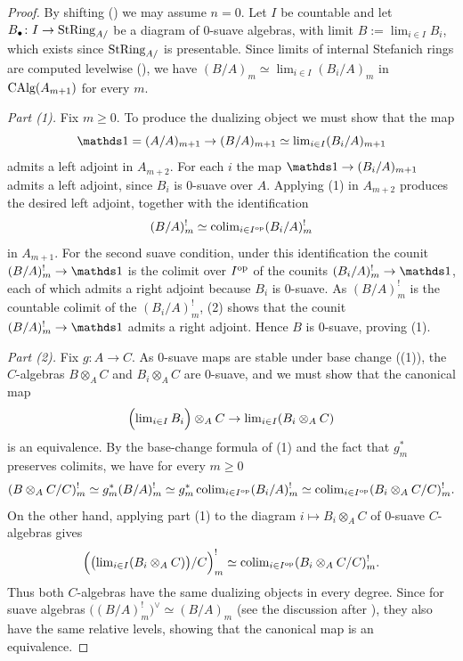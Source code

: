 \documentclass[11pt]{book}
\begin{document}
	\begin{proof}
		By shifting () we may assume $n = 0$. Let $I$ be countable and let $B_\bullet\colon I \to \StRing_{A/}$ be a diagram of $0$-suave algebras, with limit $B := \lim_{i \in I} B_i$, which exists since $\StRing_{A/}$ is presentable. Since limits of internal Stefanich rings are computed levelwise (), we have $(B/A)_m \simeq \lim_{i \in I} (B_i/A)_m$ in $\CAlg(A_{m+1})$ for every $m$.

		\emph{Part (1).} Fix $m \geq 0$. To produce the dualizing object we must show that the map
		\[
			\unit = (A/A)_{m+1} \to (B/A)_{m+1} \simeq \lim_{i \in I} (B_i/A)_{m+1}
		\]
		admits a left adjoint in $A_{m+2}$. For each $i$ the map $\unit \to (B_i/A)_{m+1}$ admits a left adjoint, since $B_i$ is $0$-suave over $A$. Applying (1) in $A_{m+2}$ produces the desired left adjoint, together with the identification
		\[
			(B/A)^!_m \simeq \colim_{i \in I\catop} (B_i/A)^!_m
		\]
		in $A_{m+1}$. For the second suave condition, under this identification the counit $(B/A)^!_m \to \unit$ is the colimit over $I\catop$ of the counits $(B_i/A)^!_m \to \unit$, each of which admits a right adjoint because $B_i$ is $0$-suave. As $(B/A)^!_m$ is the countable colimit of the $(B_i/A)^!_m$, (2) shows that the counit $(B/A)^!_m \to \unit$ admits a right adjoint. Hence $B$ is $0$-suave, proving (1).

		\emph{Part (2).} Fix $g\colon A \to C$. As $0$-suave maps are stable under base change ((1)), the $C$-algebras $B \otimes_A C$ and $B_i \otimes_A C$ are $0$-suave, and we must show that the canonical map
		\[
			\Bigl(\lim_{i \in I} B_i\Bigr) \otimes_A C \to \lim_{i \in I} (B_i \otimes_A C)
		\]
		is an equivalence. By the base-change formula of (1) and the fact that $g_m^*$ preserves colimits, we have for every $m \geq 0$
		\[
			(B \otimes_A C/C)^!_m
			\simeq g_m^*(B/A)^!_m
			\simeq g_m^* \colim_{i \in I\catop} (B_i/A)^!_m
			\simeq \colim_{i \in I\catop} (B_i \otimes_A C/C)^!_m.
		\]
		On the other hand, applying part (1) to the diagram $i \mapsto B_i \otimes_A C$ of $0$-suave $C$-algebras gives
		\[
			\Bigl(\bigl(\lim_{i \in I} (B_i \otimes_A C)\bigr)/C\Bigr)^!_m \simeq \colim_{i \in I\catop} (B_i \otimes_A C/C)^!_m.
		\]
		Thus both $C$-algebras have the same dualizing objects in every degree. Since for suave algebras $\bigl((B/A)^!_m\bigr)^{\vee} \simeq (B/A)_m$ (see the discussion after ), they also have the same relative levels, showing that the canonical map is an equivalence.
	\end{proof}
\end{document}
